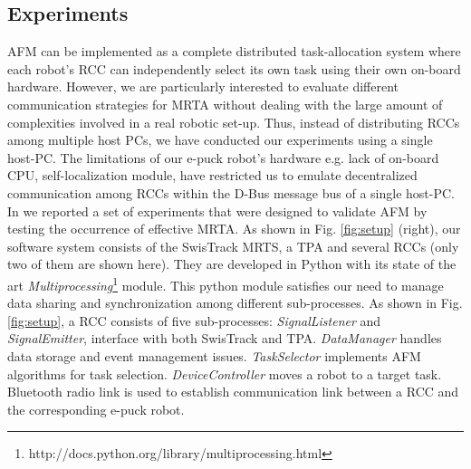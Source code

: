 \documentclass[draft]{ifacconf}
\begin{document}
\subsection{Experiments}
AFM can be implemented as a complete distributed task-allocation system where each robot's RCC can independently select its own task using their own on-board hardware. However, we are particularly interested to evaluate different communication strategies for MRTA without dealing with the large amount of complexities involved in a real robotic set-up. Thus, instead of distributing RCCs among multiple host PCs, we have conducted our experiments using a single host-PC. The limitations of our e-puck robot's hardware e.g. lack of on-board CPU, self-localization module, have restricted us to emulate decentralized communication among RCCs within the D-Bus message bus of a single host-PC.\\ 
In \cite{Sarker+2010ants} we reported a set of experiments that were designed to validate AFM by testing the occurrence of effective MRTA.  As shown in Fig. \ref{fig:setup} (right), our software system consists of the SwisTrack MRTS, a TPA and several RCCs (only two of them are shown here). They are developed in Python with its state of the art \textit{Multiprocessing}\footnote{http://docs.python.org/library/multiprocessing.html} module. This python module satisfies our need to manage data sharing and synchronization among different sub-processes. As shown in Fig. \ref{fig:setup}, a RCC consists of five sub-processes: {\em SignalListener} and {\em SignalEmitter}, interface with both SwisTrack and TPA. {\em DataManager} handles data storage and event management issues. {\em TaskSelector} implements AFM algorithms for task selection. {\em DeviceController} moves a robot to a target task. Bluetooth radio link is used to establish communication link between a RCC and the corresponding e-puck robot.  
\end{document}
